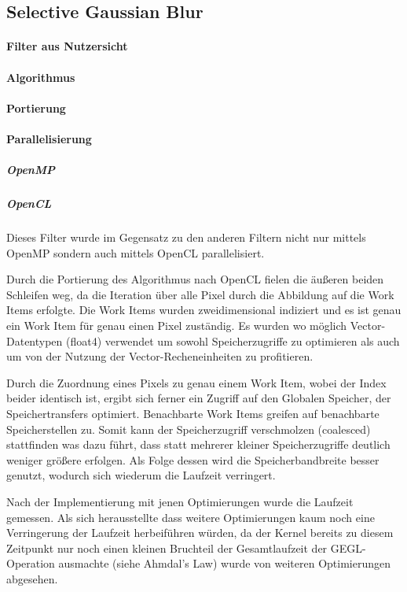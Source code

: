 \documentclass[10pt,a4paper]{article}
\begin{document}
\subsection{Selective Gaussian Blur}
\paragraph{Filter aus Nutzersicht}
\paragraph{Algorithmus} 
\paragraph{Portierung}
\paragraph{Parallelisierung}
\subparagraph{OpenMP}
\subparagraph{OpenCL}
Dieses Filter wurde im Gegensatz zu den anderen Filtern nicht nur mittels OpenMP sondern auch mittels OpenCL parallelisiert. 



Durch die Portierung des Algorithmus nach OpenCL fielen die äußeren beiden Schleifen weg, da die Iteration über alle Pixel durch die Abbildung auf die Work Items erfolgte. Die Work Items wurden zweidimensional indiziert und es ist genau ein Work Item für genau einen Pixel zuständig.
Es wurden wo möglich Vector-Datentypen (float4) verwendet um sowohl Speicherzugriffe zu optimieren als auch um von der Nutzung der Vector-Recheneinheiten zu profitieren.

Durch die Zuordnung eines Pixels zu genau einem Work Item, wobei der Index beider identisch ist, ergibt sich ferner ein Zugriff auf den Globalen Speicher, der Speichertransfers optimiert. Benachbarte Work Items greifen auf benachbarte Speicherstellen zu. Somit kann der Speicherzugriff verschmolzen (coalesced) stattfinden was dazu führt, dass statt mehrerer kleiner Speicherzugriffe deutlich weniger größere erfolgen. Als Folge dessen wird die Speicherbandbreite besser genutzt, wodurch sich wiederum die Laufzeit verringert.

Nach der Implementierung mit jenen Optimierungen wurde die Laufzeit gemessen. Als sich herausstellte dass weitere Optimierungen kaum noch eine Verringerung der Laufzeit herbeiführen würden, da der Kernel bereits zu diesem Zeitpunkt nur noch einen kleinen Bruchteil der Gesamtlaufzeit der GEGL-Operation ausmachte (siehe Ahmdal's Law) wurde von weiteren Optimierungen abgesehen.
\end{document}
